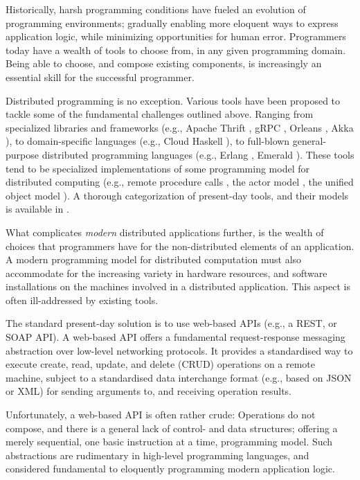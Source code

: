 \medskip

Historically, harsh programming conditions have fueled an evolution of
programming environments; gradually enabling more eloquent ways to
express application logic, while minimizing opportunities for human
error. Programmers today have a wealth of tools to choose from, in any
given programming domain. Being able to choose, and compose existing
components, is increasingly an essential skill for the successful
programmer.

Distributed programming is no exception. Various tools have been
proposed to tackle some of the fundamental challenges outlined above.
Ranging from specialized libraries and frameworks (e.g., Apache Thrift
\cite{slee2007thrift}, gRPC \cite{grpc2018}, Orleans
\cite{bernstein2014orleans}, Akka \cite{akka2018}), to domain-specific
languages (e.g., Cloud Haskell \cite{epstein2011towards}), to
full-blown general-purpose distributed programming languages (e.g.,
Erlang \cite{armstrong2003making}, Emerald
\cite{black1987distribution}).  These tools tend to be specialized
implementations of some programming model for distributed computing
(e.g., remote procedure calls \cite{birrell1984implementing}, the
actor model \cite{hewitt1973session}, the unified object model
\cite{black1987distribution}). A thorough categorization of
present-day tools, and their models is available in
\cite{miller2017dist-prog-book}.

\medskip

What complicates \emph{modern} distributed applications further, is
the wealth of choices that programmers have for the non-distributed
elements of an application. A modern programming model for distributed
computation must also accommodate for the increasing variety in
hardware resources, and software installations on the machines
involved in a distributed application. This aspect is often
ill-addressed by existing tools.

The standard present-day solution is to use web-based APIs (e.g., a
REST, or SOAP API). A web-based API offers a fundamental
request-response messaging abstraction over low-level networking
protocols. It provides a standardised way to execute create, read,
update, and delete (CRUD) operations on a remote machine, subject to a
standardised data interchange format (e.g., based on JSON or XML) for
sending arguments to, and receiving operation results.

\medskip

Unfortunately, a web-based API is often rather crude: Operations do
not compose, and there is a general lack of control- and data
structures; offering a merely sequential, one basic instruction at a
time, programming model. Such abstractions are rudimentary in
high-level programming languages, and considered fundamental to
eloquently programming modern application logic.

